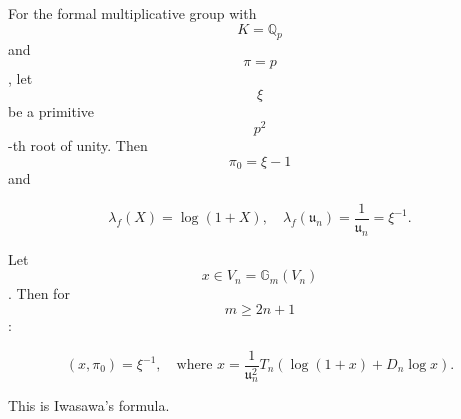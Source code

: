 For the formal multiplicative group with $$K = \mathbb{Q}_p$$ and $$\pi = p$$, let $$\xi$$ be a primitive $$p^2$$-th root of unity. Then $$\pi_0 = \xi - 1$$ and

$$\lambda_f(X) = \log(1 + X), \quad \lambda_f(\mathfrak{u}_n) = \frac{1}{\mathfrak{u}_n} = \xi^{-1}.$$

Let $$x \in V_n = \mathbb{G}_m(V_n)$$. Then for $$m \geq 2n + 1$$:

$$(x, \pi_0) = \xi^{-1}, \quad \text{where } x = \frac{1}{\mathfrak{u}_n^2} T_n(\log(1 + x) + D_n \log x).$$

This is Iwasawa's formula.
